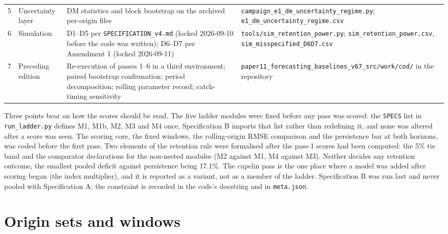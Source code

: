 \begin{table}[!htb]
\begin{tabularx}{\textwidth}{@{}clLL@{}}
5 & Uncertainty layer & DM statistics and block bootstrap on the archived per-origin files & \texttt{campaign\_\allowbreak{}e1\_\allowbreak{}dm\_\allowbreak{}uncertainty\_\allowbreak{}regime.py}; \texttt{e1\_\allowbreak{}dm\_\allowbreak{}uncertainty\_\allowbreak{}regime.csv} \\
6 & Simulation & D1--D5 per \texttt{SPECIFICATION\_\allowbreak{}v4.md} (locked 2026-09-10 before the code was written); D6--D7 per Amendment 1 (locked 2026-09-11) & \texttt{tools/\allowbreak{}sim\_\allowbreak{}retention\_\allowbreak{}power.py}; \texttt{sim\_\allowbreak{}retention\_\allowbreak{}power.csv}, \texttt{sim\_\allowbreak{}misspecified\_\allowbreak{}D6D7.csv} \\
7 & Preceding edition & Re-execution of passes 1--6 in a third environment; paired bootstrap confirmation; period decomposition; rolling parameter record; catch-timing sensitivity & \texttt{paper11\_\allowbreak{}forecasting\_\allowbreak{}baselines\_\allowbreak{}v67\_\allowbreak{}src/\allowbreak{}work/\allowbreak{}cod/\allowbreak{}} in the repository \\
\bottomrule
\end{tabularx}
\end{table}

Three points bear on how the scores should be read. The five ladder modules were fixed before any pass was scored: the \texttt{SPECS} list in \texttt{run\_ladder.py} defines M1, M1b, M2, M3 and M4 once, Specification B imports that list rather than redefining it, and none was altered after a score was seen. The scoring core, the fixed windows, the rolling-origin RMSE comparison and the persistence bar at both horizons, was coded before the first pass. Two elements of the retention rule were formalised after the pass-1 scores had been computed: the 5\% tie band and the comparator declarations for the non-nested modules (M2 against M1, M4 against M3). Neither decides any retention outcome, the smallest pooled deficit against persistence being 17.1\%. The capelin pass is the one place where a model was added after scoring began (the index multiplier), and it is reported as a variant, not as a member of the ladder. Specification B was run last and never pooled with Specification A; the constraint is recorded in the code's docstring and in \texttt{meta.json}.

\section{Origin sets and windows}\label{si:origins}

